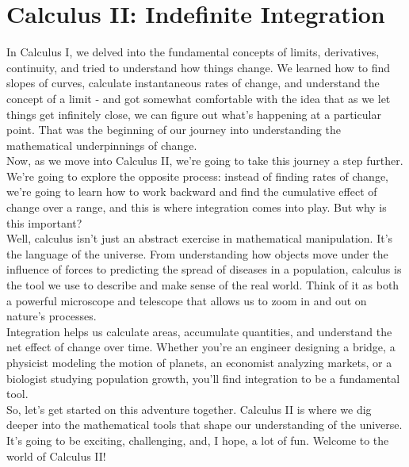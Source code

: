 \chapter{Calculus II: Indefinite Integration}
In Calculus I, we delved into the fundamental concepts of limits, derivatives, continuity, and tried to understand how things change. We learned how to find slopes of curves, calculate instantaneous rates of change, and understand the concept of a limit - and got somewhat comfortable with the idea that as we let things get infinitely close, we can figure out what's happening at a particular point. That was the beginning of our journey into understanding the mathematical underpinnings of change.\\
Now, as we move into Calculus II, we're going to take this journey a step further. We're going to explore the opposite process: instead of finding rates of change, we're going to learn how to work backward and find the cumulative effect of change over a range, and this is where integration comes into play. But why is this important?\\
Well, calculus isn't just an abstract exercise in mathematical manipulation. It's the language of the universe. From understanding how objects move under the influence of forces to predicting the spread of diseases in a population, calculus is the tool we use to describe and make sense of the real world. Think of it as both a powerful microscope and telescope that allows us to zoom in and out on nature's processes.\\
Integration helps us calculate areas, accumulate quantities, and understand the net effect of change over time. Whether you're an engineer designing a bridge, a physicist modeling the motion of planets, an economist analyzing markets, or a biologist studying population growth, you'll find integration to be a fundamental tool.\\
So, let's get started on this adventure together. Calculus II is where we dig deeper into the mathematical tools that shape our understanding of the universe. It's going to be exciting, challenging, and, I hope, a lot of fun. Welcome to the world of Calculus II!\\
